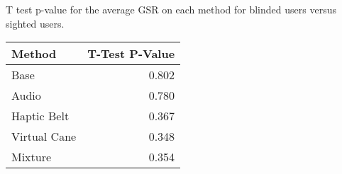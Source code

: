 
\centering
\caption{T test p-value for the average GSR on each method for blinded users versus sighted users.}
\label{tab:ttest_gsr}
\begin{tabular}{lr}
\toprule
      Method &  T-Test P-Value \\
\midrule
        Base &           0.802 \\
       Audio &           0.780 \\
 Haptic Belt &           0.367 \\
Virtual Cane &           0.348 \\
     Mixture &           0.354 \\
\bottomrule
\end{tabular}
